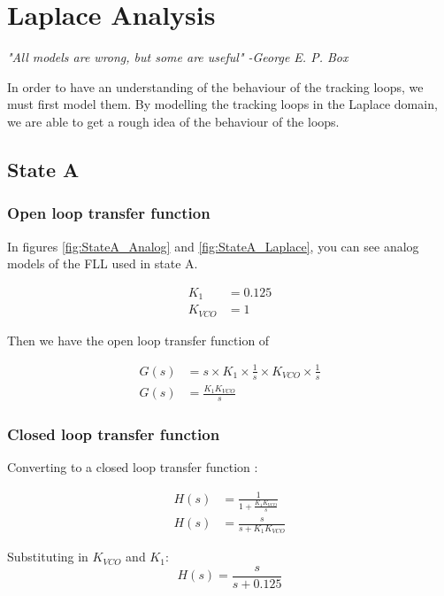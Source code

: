 \label{ch:LaplaceAnalysis}
\chapter{Laplace Analysis}

\emph{"All models are wrong, but some are useful" -George E. P. Box}

In order to have an understanding of the behaviour of the tracking loops, we must first model them. By modelling the tracking loops in the Laplace domain, we are able to get a rough idea of the behaviour of the loops. 



\section{State A}



\subsection{Open loop transfer function}
In figures \ref{fig:StateA_Analog} and \ref{fig:StateA_Laplace}, you can see analog models of the FLL used in state A. 

\begin{align*}
K_1 &= 0.125\\
K_{VCO} &= 1
\end{align*}

Then we have the open loop transfer function of 

\begin{align}
G(s) &= s  \times K_1 \times \frac{1}{s} \times  
K_{VCO} \times \frac{1}{s}\\
G(s) &= \frac{K_1 K_{VCO}}{s}
\end{align}

\subsection{Closed loop transfer function}
Converting to a closed loop transfer function :

\begin{align}
H(s) &= \frac{1}{1+\frac{K_1 K_{VCO}}{s}}\\
H(s) &= \frac{s}{s+K_1 K_{VCO}}
\end{align}

Substituting in $K_{VCO}$ and $K_1$: 
\begin{equation}
H(s) = \frac{s}{s+0.125}
\end{equation}

